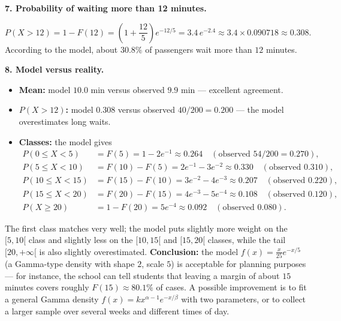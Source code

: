 \documentclass[11pt]{article}
\begin{document}
\textbf{7. Probability of waiting more than 12 minutes.}\par
\[
P(X>12) = 1 - F(12) = \left(1 + \frac{12}{5}\right)e^{-12/5} = 3.4\,e^{-2.4} \approx 3.4 \times 0.090718 \approx \boxed{0.308}.
\]
According to the model, about $30.8\%$ of passengers wait more than $12$ minutes.

\textbf{8. Model versus reality.}\par
\begin{itemize}
\item \textbf{Mean:} model $10.0$ min versus observed $9.9$ min — excellent agreement.
\item \textbf{$P(X>12)$:} model $0.308$ versus observed $40/200 = 0.200$ — the model overestimates long waits.
\item \textbf{Classes:} the model gives
\begin{align*}
P(0\leq X<5) &= F(5) = 1-2e^{-1} \approx 0.264 \quad (\text{observed } 54/200 = 0.270),\\
P(5\leq X<10) &= F(10)-F(5) = 2e^{-1}-3e^{-2} \approx 0.330 \quad (\text{observed } 0.310),\\
P(10\leq X<15) &= F(15)-F(10) = 3e^{-2}-4e^{-3} \approx 0.207 \quad (\text{observed } 0.220),\\
P(15\leq X<20) &= F(20)-F(15) = 4e^{-3}-5e^{-4} \approx 0.108 \quad (\text{observed } 0.120),\\
P(X\geq 20) &= 1-F(20) = 5e^{-4} \approx 0.092 \quad (\text{observed } 0.080).
\end{align*}
\end{itemize}
The first class matches very well; the model puts slightly more weight on the $[5,10[$ class and slightly less on the $[10,15[$ and $[15,20[$ classes, while the tail $[20,+\infty[$ is also slightly overestimated. \textbf{Conclusion:} the model $f(x) = \frac{x}{25}e^{-x/5}$ (a Gamma-type density with shape $2$, scale $5$) is acceptable for planning purposes — for instance, the school can tell students that leaving a margin of about $15$ minutes covers roughly $F(15) \approx 80.1\%$ of cases. A possible improvement is to fit a general Gamma density $f(x) = kx^{\alpha-1}e^{-x/\beta}$ with two parameters, or to collect a larger sample over several weeks and different times of day.
\end{document}
